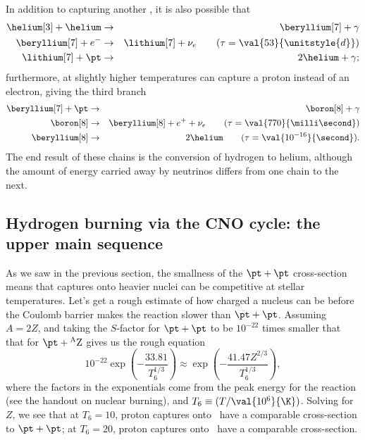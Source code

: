 In addition to capturing another \helium[3], it is also possible that
\begin{eqnarray}
\helium[3] + \helium &\to& \beryllium[7] + \gamma\nonumber\\
 \beryllium[7] + e^{-} &\to& \lithium[7] +  \nu_{e}\qquad(\tau=\val{53}{\unitstyle{d}})\nonumber \\
 \lithium[7] + \pt &\to& 2\helium + \gamma;
 \end{eqnarray}
furthermore, at slightly higher temperatures \beryllium[7] can capture a proton instead of an electron, giving the third branch
\begin{eqnarray}
\beryllium[7] + \pt &\to& \boron[8] + \gamma\nonumber\\
\boron[8] &\to& \beryllium[8] + e^{+} + \nu_{e}\qquad(\tau = \val{770}{\milli\second})\nonumber\\
\beryllium[8] &\to& 2\helium\qquad(\tau= \val{10^{-16}}{\second}).
\end{eqnarray}
 The end result of these chains is the conversion of hydrogen to helium, although the amount of energy carried away by neutrinos differs from one chain to the next.

\subsection[The CNO cycle]{Hydrogen burning via the CNO cycle: the upper main sequence}

As we saw in the previous section, the smallness of the $\pt+\pt$ cross-section means that captures onto heavier nuclei can be competitive at stellar temperatures.  Let's get a rough estimate of how charged a nucleus can be before the Coulomb barrier makes the reaction slower than $\pt+\pt$.  Assuming $A = 2Z$, and taking the $S$-factor for $\pt+\pt$ to be $10^{-22}$ times smaller that that for $\pt + \mathrm{^{A}Z}$ gives us the rough equation
\[ 10^{-22}\exp\left(-\frac{33.81}{T_{6}^{1/3}}\right) \approx \exp\left(-\frac{41.47 Z^{2/3}}{T_{6}^{1/3}}\right), \]
where the factors in the exponentials come from the peak energy for the reaction (see the handout on nuclear burning), and $T_{6}\equiv (T/\val{10^{6}}{\K})$.  Solving for $Z$, we see that at $T_{6} = 10$, proton captures onto \carbon\ have a comparable cross-section to $\pt + \pt$; at $T_{6} = 20$, proton captures onto \oxygen\ have a comparable cross-section.


